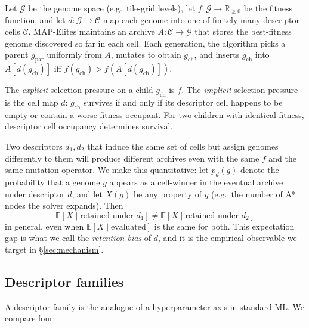 \documentclass[conference]{IEEEtran}
\begin{document}
Let $\mathcal{G}$ be the genome space (e.g.\ tile-grid levels), let
$f:\mathcal{G}\to\mathbb{R}_{\geq 0}$ be the fitness function, and
let $d:\mathcal{G}\to\mathcal{C}$ map each genome into one of finitely
many descriptor cells $\mathcal{C}$. MAP-Elites maintains an archive
$A: \mathcal{C}\to \mathcal{G}$ that stores the best-fitness genome
discovered so far in each cell. Each generation, the algorithm picks
a parent $g_\text{par}$ uniformly from $A$, mutates to obtain
$g_\text{ch}$, and inserts $g_\text{ch}$ into $A[d(g_\text{ch})]$ iff
$f(g_\text{ch}) > f(A[d(g_\text{ch})])$.

The \emph{explicit} selection pressure on a child $g_\text{ch}$ is
$f$. The \emph{implicit} selection pressure is the cell map $d$:
$g_\text{ch}$ survives if and only if its descriptor cell happens to
be empty or contain a worse-fitness occupant. For two children with
identical fitness, descriptor cell occupancy determines survival.

Two descriptors $d_1, d_2$ that induce the same set of cells but
assign genomes differently to them will produce different archives
even with the same $f$ and the same mutation operator. We make this
quantitative: let $p_d(g)$ denote the probability that a genome $g$
appears as a cell-winner in the eventual archive under descriptor
$d$, and let $X(g)$ be any property of $g$ (e.g.\ the number of A*
nodes the solver expands). Then
\[
   \mathbb{E}[X \mid \text{retained under } d_1] \neq
   \mathbb{E}[X \mid \text{retained under } d_2]
\]
in general, even when $\mathbb{E}[X \mid \text{evaluated}]$ is the
same for both. This expectation gap is what we call the
\emph{retention bias} of $d$, and it is the empirical observable we
target in \S\ref{sec:mechanism}.

\subsection{Descriptor families}

A descriptor family is the analogue of a hyperparameter axis in
standard ML. We compare four:
\end{document}
